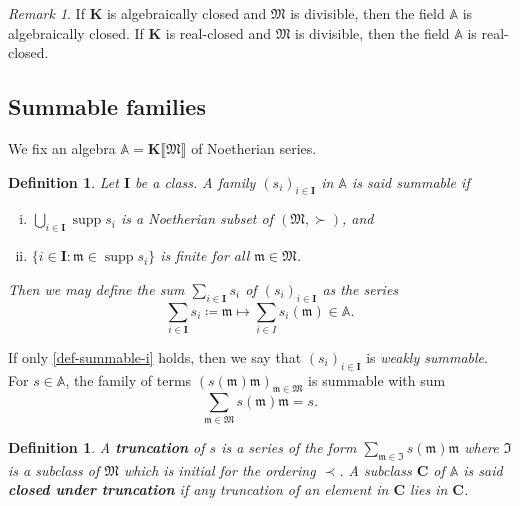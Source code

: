 \documentclass{article}
\newcommand{\assign}{\coloneqq}
\newcommand{\suchthat}{:}
\newcommand{\tmem}[1]{{\em #1\/}}
\newcommand{\tmop}[1]{\ensuremath{\operatorname{#1}}}
\newcommand{\tmstrong}[1]{\textbf{#1}}
\newenvironment{enumerateroman}{\begin{enumerate}[i.] }{\end{enumerate}}
\newtheorem{definition}[theorem]{Definition}
\theoremstyle{remark}\newtheorem*{convention*}{Convention}
\newtheorem{remark}[theorem]{Remark}
\begin{document}
\begin{remark}
  \label{rem-alg-closed}If $\mathbf{K}$ is algebraically closed and
  $\mathfrak{M}$ is divisible, then {\cite{MacLane:pow}} the field
  $\mathbb{A}$ is algebraically closed. If $\mathbf{K}$ is real-closed and
  $\mathfrak{M}$ is divisible, then the field $\mathbb{A}$ is real-closed.
\end{remark}

\subsection{Summable families}

We fix an algebra $\mathbb{A}= \mathbf{K} \llbracket \mathfrak{M} \rrbracket$
of Noetherian series.

\begin{definition}
  Let $\mathbf{I}$ be a class. A family $(s_i)_{i \in \mathbf{I}}$ in
  $\mathbb{A}$ is said {\tmem{summable}}{} if
  \begin{enumerateroman}
    \item \label{def-summable-i}$\bigcup_{i \in \mathbf{I}} \tmop{supp} s_i$
    is a Noetherian subset of $(\mathfrak{M}, \succ)$, and
    
    \item $\{ i \in \mathbf{I} \suchthat \mathfrak{m} \in \tmop{supp} s_i \}$
    is finite for all $\mathfrak{m} \in \mathfrak{M}$.
  \end{enumerateroman}
  Then we may define the sum $\sum_{i \in \mathbf{I}} s_i$ of $(s_i)_{i \in
  \mathbf{I}}$ as the series
  \[ \sum_{i \in \mathbf{I}} s_i \assign \mathfrak{m} \longmapsto \sum_{i \in
     I} s_i (\mathfrak{m}) \in \mathbb{A}. \]
\end{definition}

If only \ref{def-summable-i} holds, then we say that $(s_i)_{i \in
\mathbf{I}}$ is {\tmem{weakly summable}}. For $s \in \mathbb{A}$, the family
of terms $(s (\mathfrak{m})\mathfrak{m})_{\mathfrak{m} \in \mathfrak{M}}$ is
summable with sum
\[ \sum_{\mathfrak{m} \in \mathfrak{M}} s (\mathfrak{m}) \mathfrak{m}= s. \]
\begin{definition}
  \label{def-truncation}A {\tmstrong{{\tmem{truncation}}}} of $s$ is a series
  of the form $\sum_{\mathfrak{m} \in \mathfrak{I}} s (\mathfrak{m})
  \mathfrak{m}$ where $\mathfrak{I}$ is a subclass of $\mathfrak{M}$ which is
  initial for the ordering $\prec$. A subclass $\mathbf{C}$ of $\mathbb{A}$ is
  said {\tmem{{\tmstrong{closed under truncation}}}} if any truncation of an
  element in $\mathbf{C}$ lies in $\mathbf{C}$.
\end{definition}
\end{document}
